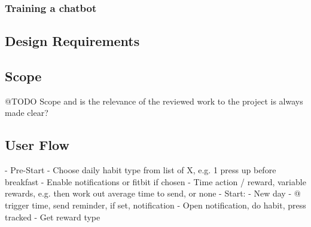 \subsubsection*{Training a chatbot}

\subsection{Design Requirements}

\subsection{Scope}

@TODO Scope and is the relevance of the reviewed work to the project is always made clear?


\subsection{User Flow}
  - Pre-Start
    - Choose daily habit type from list of X, e.g. 1 press up before breakfast
    - Enable notifications or fitbit if chosen
    - Time action / reward, variable rewards, e.g. then work out average time to send, or none
  - Start:
    - New day
    - @ trigger time, send reminder, if set, notification
    - Open notification, do habit, press tracked
    - Get reward type
